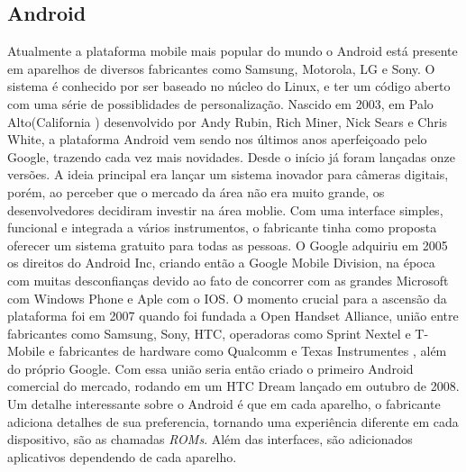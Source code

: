 \documentclass[12pt]{article}
\begin{document}
\subsection{Android}
	Atualmente a plataforma mobile mais popular do mundo o Android está presente em aparelhos de diversos fabricantes como Samsung, Motorola, LG e Sony. O sistema é conhecido por ser baseado no núcleo do Linux, e ter um código aberto com uma série de possiblidades de personalização.
	Nascido em 2003, em Palo Alto(California ) desenvolvido por Andy Rubin, Rich Miner, Nick Sears e Chris White, a plataforma Android vem sendo nos últimos anos aperfeiçoado pelo Google, trazendo cada vez mais novidades. Desde o início já foram lançadas onze versões.
	A ideia principal era lançar um sistema inovador para câmeras digitais, porém, ao perceber que o mercado da área não era muito grande, os desenvolvedores decidiram investir na área moblie. Com uma interface simples, funcional e integrada a vários instrumentos, o fabricante tinha como proposta oferecer um sistema gratuito para todas as pessoas.
	O Google adquiriu em 2005 os direitos do Android Inc, criando então a Google Mobile Division, na época com muitas desconfianças devido ao fato de concorrer com as grandes Microsoft com Windows Phone e Aple com o IOS.
	O momento crucial para a ascensão da plataforma foi em 2007 quando foi fundada a Open Handset Alliance, união entre fabricantes como Samsung, Sony, HTC, operadoras como Sprint Nextel e T-Mobile e fabricantes de hardware como Qualcomm e Texas Instrumentes , além do próprio Google. Com essa união seria então criado o primeiro Android comercial do mercado, rodando em um HTC Dream lançado em outubro de 2008.
	Um detalhe interessante sobre o Android é que em cada aparelho, o fabricante adiciona detalhes de sua preferencia, tornando uma experiência diferente em cada dispositivo, são as chamadas \textit{ROMs}. Além das interfaces, são adicionados aplicativos dependendo de cada aparelho.
\end{document}
